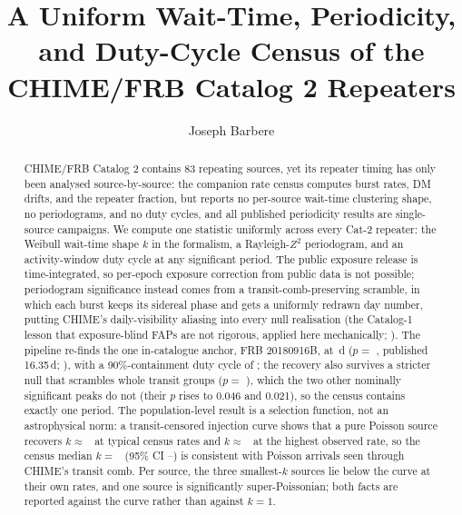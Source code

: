 \documentclass[twocolumn]{aastex631}
\begin{document}
\title{A Uniform Wait-Time, Periodicity, and Duty-Cycle Census of the
CHIME/FRB Catalog 2 Repeaters}
\author[0009-0008-3289-4447]{Joseph Barbere}

\begin{abstract}
CHIME/FRB Catalog 2 \citep{cat2} contains 83 repeating sources, yet its repeater timing has
only been analysed source-by-source: the companion rate census \citep{cook2026} computes
burst rates, DM drifts, and the repeater fraction, but reports no per-source wait-time
clustering shape, no periodograms, and no duty cycles, and all published periodicity results
are single-source campaigns. We compute one statistic uniformly across every Cat-2 repeater:
the Weibull wait-time shape $k$ in the \citet{oppermann2018} formalism, a Rayleigh-$Z^2$
periodogram, and an activity-window duty cycle at any significant period. The public exposure
release is time-integrated, so per-epoch exposure correction from public data is not
possible; periodogram significance instead comes from a transit-comb-preserving scramble, in
which each burst keeps its sidereal phase and gets a uniformly redrawn day number, putting
CHIME's daily-visibility aliasing into every null realisation (the Catalog-1 lesson that
exposure-blind FAPs are not rigorous, applied here mechanically; \citealt{cat1}). The pipeline re-finds the
one in-catalogue anchor, FRB 20180916B, at \fwRealAnchorPeriod\,d ($p=$ \fwRealAnchorP,
published 16.35\,d; \citealt{chime2020period}), with a 90\%-containment duty cycle of
\fwRealAnchorDuty; the recovery also survives a stricter null that scrambles whole transit
groups ($p=$ \fwRealAnchorPGrouped), which the two other nominally significant peaks do not
(their $p$ rises to 0.046 and 0.021), so the census contains exactly one period. The
population-level result is a selection function, not an astrophysical norm: a transit-censored
injection curve shows that a pure Poisson source recovers $k\approx$ \fwRealBiasKMidRate\ at
typical census rates and $k\approx$ \fwRealBiasKHiRate\ at the highest observed rate, so the
census median $k=$ \fwRealMedianK\ (95\% CI \fwRealMedianKlo--\fwRealMedianKhi) is consistent
with Poisson arrivals seen through CHIME's transit comb. Per source, the three smallest-$k$
sources lie below the curve at their own rates, and one source is significantly
super-Poissonian; both facts are reported against the curve rather than against $k=1$.
\end{abstract}

\end{document}
